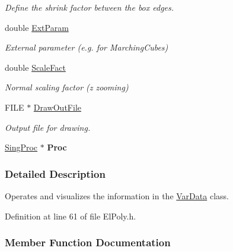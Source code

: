 \begin{DoxyCompactItemize}
\begin{DoxyCompactList}\small\item\em Define the shrink factor between the box edges. \end{DoxyCompactList}\item 
double \hyperlink{classElPoly_a669c83da48812050d13a2c63fff0fef9}{Ext\+Param}\hypertarget{classElPoly_a669c83da48812050d13a2c63fff0fef9}{}\label{classElPoly_a669c83da48812050d13a2c63fff0fef9}

\begin{DoxyCompactList}\small\item\em External parameter (e.\+g. for Marching\+Cubes) \end{DoxyCompactList}\item 
double \hyperlink{classElPoly_ae8a6916dd0cb066c7e911f973caf504a}{Scale\+Fact}\hypertarget{classElPoly_ae8a6916dd0cb066c7e911f973caf504a}{}\label{classElPoly_ae8a6916dd0cb066c7e911f973caf504a}

\begin{DoxyCompactList}\small\item\em Normal scaling factor (z zooming) \end{DoxyCompactList}\item 
F\+I\+LE $\ast$ \hyperlink{classElPoly_a034d945a96ab42d2a57ac4e12c8aab9e}{Draw\+Out\+File}\hypertarget{classElPoly_a034d945a96ab42d2a57ac4e12c8aab9e}{}\label{classElPoly_a034d945a96ab42d2a57ac4e12c8aab9e}

\begin{DoxyCompactList}\small\item\em Output file for drawing. \end{DoxyCompactList}\item 
\hyperlink{classSingProc}{Sing\+Proc} $\ast$ {\bfseries Proc}\hypertarget{classElPoly_adde8a4e5814f247c722934064b0f68b9}{}\label{classElPoly_adde8a4e5814f247c722934064b0f68b9}

\end{DoxyCompactItemize}


\subsubsection{Detailed Description}
Operates and visualizes the information in the \hyperlink{classVarData}{Var\+Data} class. 

Definition at line 61 of file El\+Poly.\+h.



\subsubsection{Member Function Documentation}
